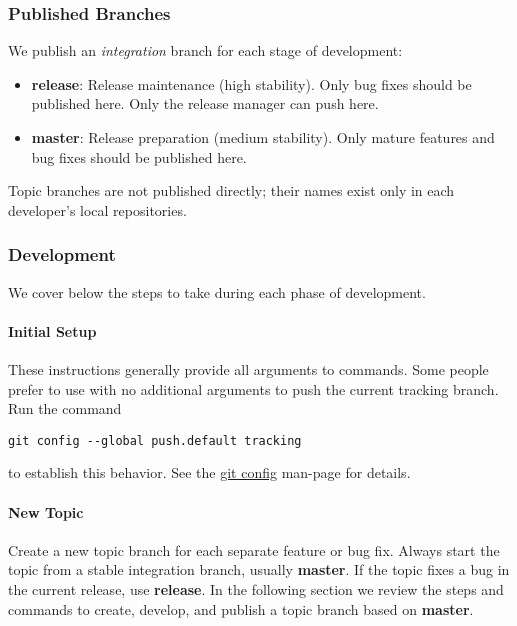 \subsubsection{Published Branches}
\label{subsubsec:PublishedBranches}

We publish an \textit{integration} branch for each stage of development:
\begin{itemize}
\item \textbf{release}: Release maintenance (high stability). Only bug fixes
should be published here. Only the release manager can push here.
\item \textbf{master}: Release preparation (medium stability). Only mature
features and bug fixes should be published here.
\end{itemize}

Topic branches are not published directly; their names exist only in each
developer's local repositories.


\subsubsection{Development}
\label{subsubsec:Development}

We cover below the steps to take during each phase of development.

\paragraph{Initial Setup}
\label{par:InitialSetup}

These instructions generally provide all arguments to  commands.
Some people prefer to use  with no additional arguments to push
the current tracking branch. Run the command

\begin{verbatim}
git config --global push.default tracking
\end{verbatim}

to establish this behavior. See the
\href{https://git-scm.com/docs/git-config}{git config} man-page for
details.


\paragraph{New Topic}
\label{par:NewTopic}

Create a new topic branch for each separate feature or bug fix. Always start the
topic from a stable integration branch, usually \textbf{master}. If the topic
fixes a bug in the current release, use \textbf{release}. In the following
section we review the steps and commands to create, develop, and publish a topic
branch based on \textbf{master}.

